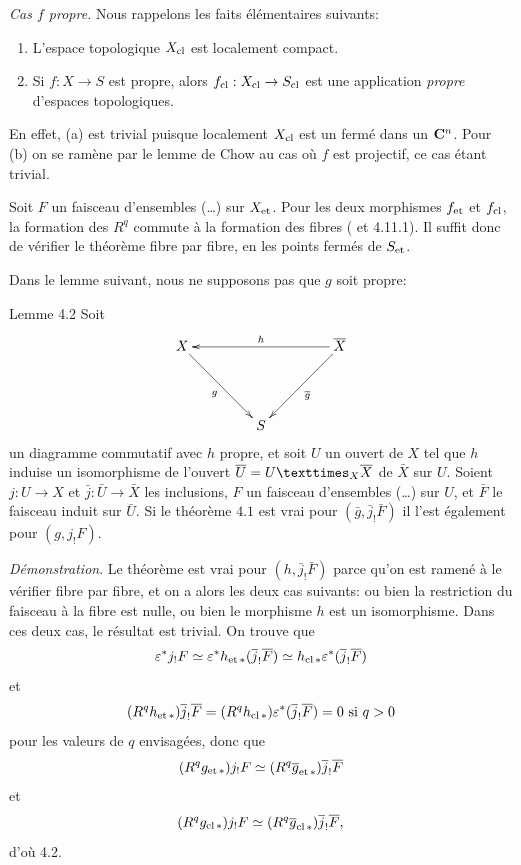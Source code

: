 \documentclass[10pt]{../fichiers-configuration-latex/smfart}
\begin{document}
\emph{Cas $f$ propre.} Nous rappelons les faits élémentaires suivants:
\begin{enumerate}
\renewcommand{\theenumi}{\alph{enumi}}
\renewcommand{\labelenumi}{(\theenumi)}
\item L'espace topologique $X_{\cl}$ est localement compact.

\item Si $f:X\rightarrow S$ est propre, alors
$f_{\cl}:X_{\cl}\rightarrow S_{\cl}$ est une application \emph{propre}
d'espaces topologiques.
\end{enumerate}

En effet, (a) est trivial puisque localement $X_{\cl}$ est un fermé
dans un $\CC^n$. Pour (b) on se ramène par le lemme de Chow au
cas où $f$ est projectif, ce cas étant trivial.

Soit $F$ un faisceau d'ensembles (\resp\ldots) sur $X_{\et}$. 
Pour les deux morphismes $f_{\et}$ et $f_{\cl}$, la
formation des $R^{q}$ commute à la formation des fibres ( et
\cite{SGA4-16:2} 4.11.1). Il suffit donc de vérifier le théorème fibre par fibre,
en les points fermés de $S_{\et}$.

Dans le lemme suivant, nous ne supposons pas que $g$ soit propre:

\begin{enonce*}{Lemme 4.2}
Soit\pageoriginale
$$
\xymatrix@=1.5cm{
X  \ar[rd]_{g}& &\bar{X} \ar[ll]_{h}\ar[ld]^{\bar{g}}\\
& S &
}
$$
un diagramme commutatif avec $h$ propre, et soit $U$ un ouvert de $X$
tel que $h$ induise un isomorphisme de l'ouvert
$\bar{U}=\fprod{U}{\bar{X}}{X}$ de $\bar{X}$ sur $U$. Soient
$j:U\rightarrow X$ et $\bar{j}:\bar{U}\rightarrow \bar{X}$ les
inclusions, $F$ un faisceau d'ensembles (\resp\ldots) sur $U$, et
$\bar{F}$ le faisceau induit sur $\bar{U}$. Si le théorème $4.1$ est
vrai pour $(\bar{g},\bar{j}_{!}\bar{F})$ il l'est également pour $(g,j_{!}F)$.
\end{enonce*}

\noindent
\emph{Démonstration}. Le théorème est vrai pour
$(h,\bar{j}_{!}\bar{F})$ parce qu'on est ramené à le vérifier
fibre par fibre, et on a alors les deux cas suivants: ou bien la
restriction du faisceau à la fibre est nulle, ou bien le morphisme $h$
est un isomorphisme. Dans ces deux cas, le résultat est trivial. On
trouve que
$$
\epsilon^{\ast}j_{!}F\simeq \epsilon {}^{\ast}h_{\text{\rm
et\,}\ast}(\bar{j}_{!}\bar{F})\simeq
h_{\cl\ast}\epsilon^{\ast}(\bar{j}_{!}\bar{F})
$$
et
$$
(R^{q}h_{\text{\rm
et\,}\ast})\bar{j}_{!}\bar{F}=(R^{q}h_{\cl\ast})\varepsilon^{\ast}(\bar{j}_{!}\bar{F})=0\text{ si } q>0
$$
pour les valeurs de $q$ envisagées, donc que
$$
(R^{q}g_{\text{\rm et\,}\ast})j_{!}F\simeq (R^{q}\bar{g}_{\text{\rm
et\,}\ast})\bar{j}_{!}\bar{F}
$$
et 
$$
(R^{q}g_{\cl \ast})j_{!}F\simeq (R^{q}\bar{g}_{\cl
\ast})\bar{j}_{!}\bar{F}{\quoi},
$$
d'où 4.2.\pageoriginale
\end{document}
